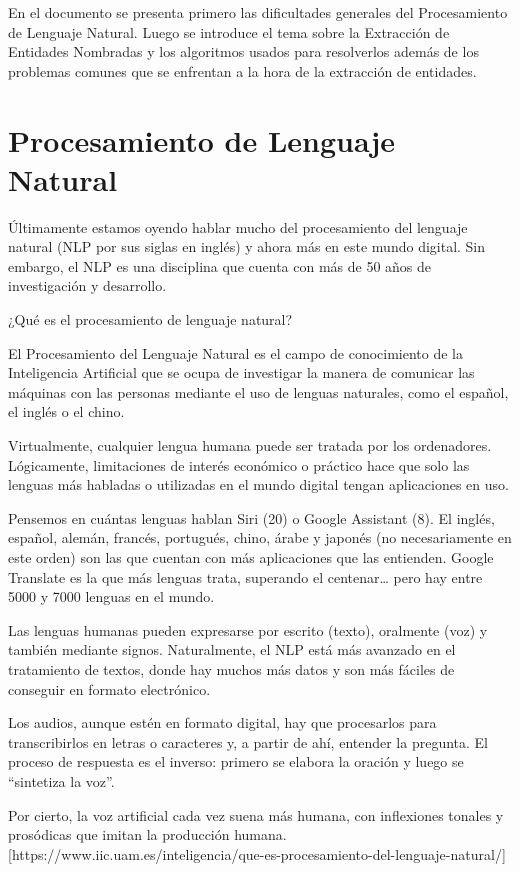 \documentclass[runningheads]{llncs}
\begin{document}
En el documento se presenta primero las dificultades generales del Procesamiento de Lenguaje Natural. Luego se introduce el tema sobre la Extracción de Entidades Nombradas y los algoritmos usados para resolverlos además de los problemas comunes que se enfrentan a la hora de la extracción de entidades.

\section{Procesamiento de Lenguaje Natural}

Últimamente estamos oyendo hablar mucho del procesamiento del lenguaje natural (NLP por sus siglas en inglés) y ahora más en este mundo digital. Sin embargo, el NLP es una disciplina que cuenta con más de 50 años de investigación y desarrollo.

¿Qué es el procesamiento de lenguaje natural?

El Procesamiento del Lenguaje Natural es el campo de conocimiento de la Inteligencia Artificial que se ocupa de investigar la manera de comunicar las máquinas con las personas mediante el uso de lenguas naturales, como el español, el inglés o el chino.

Virtualmente, cualquier lengua humana puede ser tratada por los ordenadores. Lógicamente, limitaciones de interés económico o práctico hace que solo las lenguas más habladas o utilizadas en el mundo digital tengan aplicaciones en uso.

Pensemos en cuántas lenguas hablan Siri (20) o Google Assistant (8). El inglés, español, alemán, francés, portugués, chino, árabe y japonés (no necesariamente en este orden) son las que cuentan con más aplicaciones que las entienden. Google Translate es la que más lenguas trata, superando el centenar… pero hay entre 5000 y 7000 lenguas en el mundo.

Las lenguas humanas pueden expresarse por escrito (texto), oralmente (voz) y también mediante signos. Naturalmente, el NLP está más avanzado en el tratamiento de textos, donde hay muchos más datos y son más fáciles de conseguir en formato electrónico.

Los audios, aunque estén en formato digital, hay que procesarlos para transcribirlos en letras o caracteres y, a partir de ahí, entender la pregunta. El proceso de respuesta es el inverso: primero se elabora la oración y luego se “sintetiza la voz”.

Por cierto, la voz artificial cada vez suena más humana, con inflexiones tonales y prosódicas que imitan la producción humana.[https://www.iic.uam.es/inteligencia/que-es-procesamiento-del-lenguaje-natural/]
\end{document}
